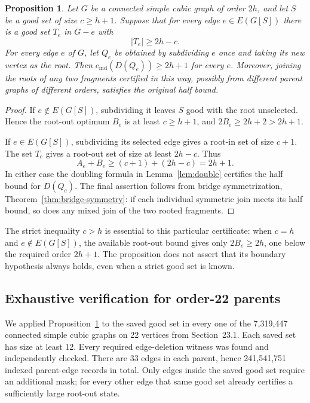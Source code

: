 \documentclass[11pt]{article}
\newtheorem{proposition}[theorem]{Proposition}
\newcommand{\cind}{c_{\mathrm{ind}}}
\begin{document}
\begin{proposition}\label{prop:edge-half-certificate}
Let $G$ be a connected simple cubic graph of order $2h$, and let $S$
be a good set of size $c\geq h+1$. Suppose that for every edge
$e\in E(G[S])$ there is a good set $T_e$ in $G-e$ with
\[
 |T_e|\geq 2h-c.
\]
For every edge $e$ of $G$, let $Q_e$ be obtained by subdividing $e$
once and taking its new vertex as the root. Then
$\cind(D(Q_e))\geq 2h+1$ for every $e$. Moreover, joining the roots of
any two fragments certified in this way, possibly from different
parent graphs of different orders, satisfies the original half bound.
\end{proposition}
\begin{proof}
If $e\notin E(G[S])$, subdividing it leaves $S$ good with the root
unselected. Hence the root-out optimum $B_e$ is at least
$c\geq h+1$, and $2B_e\geq2h+2>2h+1$.

If $e\in E(G[S])$, subdividing its selected edge gives a root-in
set of size $c+1$. The set $T_e$ gives a root-out set of size at
least $2h-c$. Thus
\[
 A_e+B_e\geq(c+1)+(2h-c)=2h+1.
\]
In either case the doubling formula in Lemma~\ref{lem:double}
certifies the half bound for $D(Q_e)$. The final assertion follows
from bridge symmetrization, Theorem~\ref{thm:bridge-symmetry}:
if each individual symmetric join meets its half bound, so does
any mixed join of the two rooted fragments.
\end{proof}

The strict inequality $c>h$ is essential to this particular
certificate: when $c=h$ and $e\notin E(G[S])$, the available root-out
bound gives only $2B_e\geq2h$, one below the required order $2h+1$.
The proposition does not assert that its boundary hypothesis always
holds, even when a strict good set is known.

\subsection{Exhaustive verification for order-22 parents}
We applied Proposition~\ref{prop:edge-half-certificate} to the saved
good set in every one of the 7,319,447 connected simple cubic graphs
on 22 vertices from Section~23.1. Each saved set has size at least
12. Every required edge-deletion witness was found and independently
checked. There are 33 edges in each parent, hence 241,541,751 indexed
parent-edge records in total. Only edges inside the saved good set
require an additional mask; for every other edge that same good set
already certifies a sufficiently large root-out state.
\end{document}
